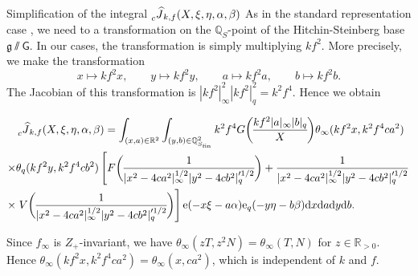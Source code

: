 \documentclass[10pt,oneside,reqno]{amsart}
\makeatletter
\newcommand\rmd{\mathrm{d}}
\newcommand\rme{\mathrm{e}}
\newcommand\QQ{\mathbb{Q}}
\newcommand\RR{\mathbb{R}}
\newcommand\mf[1]{\mathfrak{#1}}
\newcommand\G{\mathsf{G}}
\newcommand\fin{\mathrm{fin}}
\let\oldsslash\sslash
\renewcommand\sslash{{\oldsslash}}
\newcommand\legendresymbol[2]{\genfrac{(}{)}{}{}{#1}{#2}}
\def\subsection{\@startsection{subsection}{2}%
  \z@{3pt\@plus0pt}{-.5em}%
  {\normalfont\bfseries}}
\theoremstyle{THEOREM}
\theoremstyle{DEFINITION}
\theoremstyle{EXERCISE}
\numberwithin{equation}{section}
\makeatother
\begin{document}
\subsection{Simplification of the integral $\prescript{}{c}{\widehat{J}}_{k,f}(X,\xi,\eta,\alpha,\beta)$}
As in the standard representation case \cite{cheng2025c}, we need to a transformation on the $\QQ_S$-point of the Hitchin-Steinberg base $\mf{g}\sslash \G$. In our cases, the transformation is simply multiplying $kf^2$. More precisely, we make the transformation
\[
x\mapsto kf^2 x,\qquad y\mapsto kf^2y,\qquad a\mapsto kf^2 a,\qquad b\mapsto kf^2b. 
\]
The Jacobian of this transformation is $|kf^2|_\infty^2|kf^2|_q^2=k^2f^4$. Hence we obtain

\begin{align*} 
&\prescript{}{c}{\widehat{J}}_{k,f}(X,\xi,\eta,\alpha,\beta)=\int_{(x,a)\in\RR^2}\int_{(y,b)\in\QQ_{S_\fin}^2} k^2f^4 G\legendresymbol{kf^2|a|_\infty|b|_q}{X} \theta_\infty(kf^2x,k^2f^4ca^2)\\
\times&\theta_{q}(kf^2y,k^2f^4cb^2)\left[F\legendresymbol {1}{|x^2-4ca^2|_\infty^{1/2}|y^2- 4cb^2|_q'^{1/2}}+\frac{1}{|x^2-4ca^2|_\infty^{1/2}|y^2- 4cb^2|_q'^{1/2}}\right.\\
\times&\left.V\legendresymbol{1}{|x^2-4ca^2|_\infty^{1/2}|y^2- 4cb^2|_q'^{1/2}}\right]\rme(-x\xi-a\alpha)\rme_{q}(-y\eta-b\beta)\rmd x\rmd a\rmd y\rmd b.
\end{align*}

Since $f_\infty$ is $Z_+$-invariant, we have $\theta_\infty(zT,z^2N)=\theta_\infty(T,N)$ for $z\in \RR_{>0}$. Hence $\theta_\infty(kf^2x,k^2f^4ca^2)=\theta_\infty(x,ca^2)$, which is independent of $k$ and $f$. 
\end{document}
